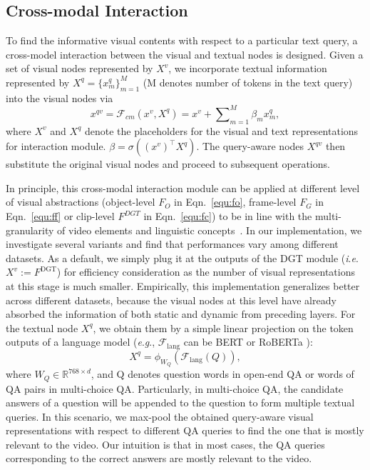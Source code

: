 \documentclass[10pt,journal,compsoc]{IEEEtran}
\newcommand{\ie}{\textit{i}.\textit{e}.}
\newcommand{\eg}{\textit{e}.\textit{g}.}
\begin{document}
\subsection{Cross-modal Interaction}
\label{sec:cm}
To find the informative visual contents with respect to a particular text query, a cross-model interaction between the visual and textual nodes is designed. Given a set of visual nodes represented by $X^v$, we incorporate textual information represented by $X^q=\{x_m^q\}_{m=1}^M$ (M denotes number of tokens in the text query) into the visual nodes via
\begin{equation}
x^{qv} =\mathcal{F}_{cm}(x^v, X^q) = x^v + \sum\nolimits_{m=1}^M \beta_m x^q_m,
\end{equation}
where $X^v$ and $X^q$ denote the placeholders for the visual and text representations for interaction module. $\beta = \sigma((x^v)^\intercal X^q)$. The query-aware nodes $X^{qv}$ then substitute the original visual nodes and proceed to subsequent operations. 

In principle, this cross-modal interaction module can be applied at different level of visual abstractions (object-level $F_O$ in Eqn.~\eqref{equ:fo}, frame-level $F_G$ in Eqn.~\eqref{equ:ff} or clip-level $F^{DGT}$ in Eqn.~\eqref{equ:fc}) to be in line with the multi-granularity of video elements and linguistic concepts~\cite{xiao2021video}.
In our implementation, we investigate several variants and find that performances vary among different datasets.
As a default, we simply plug it at the outputs of the DGT module (\ie~$X^v:=F^{\text{DGT}}$) for efficiency consideration as the number of visual representations at this stage is much smaller. Empirically, this implementation generalizes better across different datasets, because the visual nodes at this level have already absorbed the information of both static and dynamic from preceding layers. For the textual node $X^q$, we obtain them by a simple linear projection on the token outputs of a language model (\eg, $\mathcal{F}_{\text{lang}}$ can be BERT \cite{devlin2018bert} or RoBERTa \cite{liu2019roberta}):
\begin{equation}
\label{equ:bproj}
    X^q=\phi_{W_Q}(\mathcal{F}_{\text{lang}}(Q)),
\end{equation}
where $W_Q\in\mathbb{R}^{768 \times d}$, and Q denotes question words in open-end QA or words of QA pairs in multi-choice QA. Particularly, in multi-choice QA, the candidate answers of a question will be appended to the question to form multiple textual queries. In this scenario, we max-pool the obtained query-aware visual representations with respect to different QA queries to find the one that is mostly relevant to the video. Our intuition is that in most cases, the QA queries corresponding to the correct answers are mostly relevant to the video. 
\end{document}
